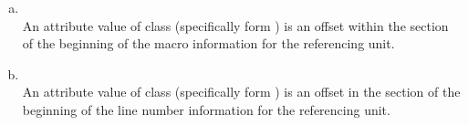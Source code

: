 \begin{enumerate}[(a)]
\item {} \\
An attribute value of class 
 (specifically form
) is an 
offset within the 
 section
of the beginning of the macro information for the referencing unit.

\item {} \\
An attribute value of class 
 (specifically form
) 
is an offset in the 
 section of the
beginning of the line number information for the referencing unit.
\end{enumerate}
